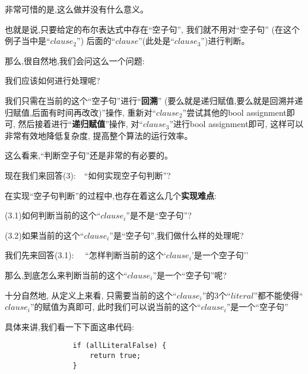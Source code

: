         \par
        非常可惜的是,这么做并没有什么意义。
        \par
        也就是说,只要给定的布尔表达式中存在``空子句'',
        我们就不用对``空子句''
        (在这个例子当中是``$clause_{2}$'')
        后面的``$clause$''(此处是``$clause_{3}$'')进行判断。
        \par
        那么,很自然地,我们会问这么一个问题:
        \begin{center}
            我们应该如何进行处理呢?    
        \end{center}
        \par
        我们只需在当前的这个``空子句''进行``\textbf{回溯}''
        (要么就是递归赋值,要么就是回溯并递归赋值,后面有时间再改改)''操作,
        重新对``$clause_{2}$''尝试其他的bool assignment即可,
        然后接着进行``\textbf{递归赋值}''操作,
        对``$clause_{3}$''进行bool assignment即可,
        这样可以非常有效地降低复杂度,
        提高整个算法的运行效率。
        \par
        这么看来,``判断空子句''还是非常的有必要的。
        \newline
        \par
        现在我们来回答(3):$\quad$``如何实现空子句判断''?
        \newline
        \par
        在实现``空子句判断''的过程中,也存在着这么几个\textbf{实现难点}:\\
        \par
            (3.1)如何判断当前的这个``$clause_{i}$''是不是``空子句''?\par
            (3.2)如果当前的这个``$clause_{i}$''是``空子句'',我们做什么样的处理呢?
        \newline
        \par
        我们先来回答(3.1):$\quad$ ``怎样判断当前的这个`$clause_{i}$'是一个空子句''
        \newline
        \par
        那么,到底怎么来判断当前的这个``$clause_{i}$''是一个``空子句''呢?
        \par
        十分自然地,
        从定义上来看,
        只需要当前的这个``$clause_{i}$''的3个``$literal$''都不能使得``$clause_{i}$''的赋值为真即可,
        此时我们可以说当前的这个``$clause_{i}$''是一个``空子句''
        \par
        具体来讲,我们看一下下面这串代码:
        \begin{lstlisting}
                if (allLiteralFalse) {
                    return true;
                }
        \end{lstlisting}
